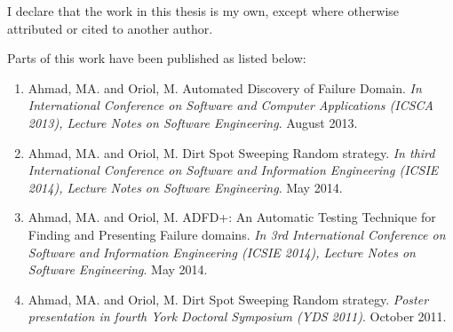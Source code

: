 \begin{declaration}

I declare that the work in this thesis is my own, except where otherwise attributed or cited to another author. 

Parts of this work have been published as listed below: 

\begin{enumerate}

\item Ahmad, MA. and Oriol, M. Automated Discovery of Failure Domain. \textit{In International Conference on Software and Computer Applications (ICSCA 2013), Lecture Notes on Software Engineering}. August 2013.

\item Ahmad, MA. and Oriol, M. Dirt Spot Sweeping Random strategy. \textit{In third International Conference on Software and Information Engineering (ICSIE 2014), Lecture Notes on Software Engineering}. May 2014.

\item Ahmad, MA. and Oriol, M. ADFD+: An Automatic Testing Technique for Finding and Presenting Failure domains. \textit{In 3rd International Conference on Software and Information Engineering (ICSIE 2014), Lecture Notes on Software Engineering}. May 2014.

\item Ahmad, MA. and Oriol, M. Dirt Spot Sweeping Random strategy. \textit{Poster presentation in fourth York Doctoral Symposium (YDS 2011)}. October 2011.

\end{enumerate}

\end{declaration}